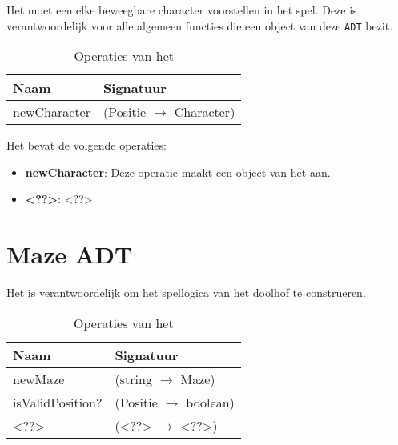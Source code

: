 Het \texttt{} moet een elke beweegbare character voorstellen in het spel.
Deze is verantwoordelijk voor alle algemeen functies die een object van deze \texttt{ADT} bezit.

\begin{table}[hbt]
\centering
\begin{tabular}{|ll|}
\hline
\rowcolor[HTML]{000000} 
{\color[HTML]{FFFFFF} \textbf{Naam}} & {\color[HTML]{FFFFFF} \textbf{Signatuur}} \\ \hline
newCharacter                                 & (Positie $\rightarrow$ Character)                                       \\ \hline
\end{tabular}
\caption{Operaties van het \texttt{}}
\label{table:character}
\end{table}

Het \texttt{} bevat de volgende operaties:

\begin{itemize}
	\item \textbf{newCharacter}: Deze operatie maakt een object van het \texttt{} aan.
	\item \textbf{<??>}: <??>
\end{itemize}

\section{Maze ADT}
\label{section:maze}

Het \texttt{} is verantwoordelijk om het spellogica van het doolhof te construeren.

\begin{table}[hbt]
\centering
\begin{tabular}{|ll|}
\hline
\rowcolor[HTML]{000000} 
{\color[HTML]{FFFFFF} \textbf{Naam}} & {\color[HTML]{FFFFFF} \textbf{Signatuur}} \\ \hline
newMaze                              & (string $\rightarrow$ Maze)               \\ \hline
isValidPosition?                      & (Positie $\rightarrow$ boolean)           \\ \hline
 <??>                                & (<??> $\rightarrow$ <??>)                 \\ \hline
\end{tabular}
\caption{Operaties van het \texttt{}}
\label{table:maze}
\end{table}

